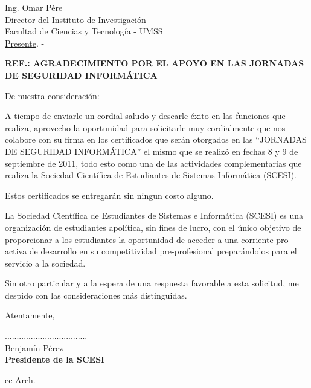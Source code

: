 \documentclass[letterpaper,12pt]{letter}
\begin{document}
\date {30 de septiembre de 2011}
\begin{letter}{ Ing. Omar P\'ere \\ Director del Instituto de Investigaci\'on \\ Facultad de Ciencias y Tecnolog\'ia - UMSS \\ \underline {Presente}. -}

\begin{center}
	\opening{\textbf{REF.: AGRADECIMIENTO POR EL APOYO EN LAS JORNADAS DE SEGURIDAD INFORM\'ATICA}}
\end{center}

De nuestra consideración:

A tiempo de enviarle un cordial saludo y desearle éxito en las funciones que realiza, aprovecho la 
oportunidad para solicitarle muy cordialmente que nos colabore con su firma en los certificados que serán 
otorgados en las ``JORNADAS DE SEGURIDAD INFORMÁTICA'' el mismo que se realiz\'o en fechas 8 y 9 de 
septiembre de 2011, todo esto como una de las actividades complementarias que realiza la Sociedad Científica 
de Estudiantes de Sistemas Informática (SCESI).

Estos certificados se entregar\'an sin ningun costo alguno.

La Sociedad Científica de Estudiantes de Sistemas e Informática (SCESI) es una organización de estudiantes apolítica, sin fines de 
lucro, con el único objetivo de proporcionar a los estudiantes la oportunidad de acceder a una corriente pro-activa de desarrollo 
en su competitividad pre-profesional preparándolos para el servicio a la sociedad.

Sin otro particular y a la espera de una respuesta favorable a esta solicitud, me despido con las consideraciones más distinguidas.

Atentamente,

\vspace{2cm}

\begin{center}
...................................\\
Benjam\'in P\'erez\\
{\bfseries Presidente de la  SCESI}
\end{center}
\vspace{2cm}
cc Arch.
\end{letter}
\end{document}

